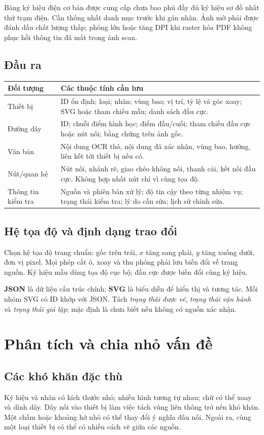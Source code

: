 \documentclass[11pt,a4paper]{article}
\begin{document}
Bảng ký hiệu điện cơ bản được cung cấp chưa bao phủ đầy đủ ký hiệu sơ đồ nhất thứ trạm điện. Cần thống nhất danh mục trước khi gán nhãn. Ảnh mờ phải được đánh dấu chất lượng thấp; phóng lớn hoặc tăng DPI khi raster hóa PDF không phục hồi thông tin đã mất trong ảnh scan.

\subsection{Đầu ra}
\begin{tabularx}{\linewidth}{@{}p{30mm}Y@{}}
\toprule
\textbf{Đối tượng} & \textbf{Các thuộc tính cần lưu}\\\midrule
Thiết bị & ID ổn định; loại; nhãn; vùng bao; vị trí, tỷ lệ và góc xoay; SVG hoặc tham chiếu mẫu; danh sách đầu cực.\\
Đường dây & ID; chuỗi điểm hình học; điểm đầu/cuối; tham chiếu đầu cực hoặc nút nối; bằng chứng trên ảnh gốc.\\
Văn bản & Nội dung OCR thô, nội dung đã xác nhận, vùng bao, hướng, liên kết tới thiết bị nếu có.\\
Nút/quan hệ & Nút nối, nhánh rẽ, giao chéo không nối, thanh cái, kết nối đầu cực. Không hợp nhất nút chỉ vì cùng tọa độ.\\
Thông tin kiểm tra & Nguồn và phiên bản xử lý; độ tin cậy theo từng nhiệm vụ; trạng thái kiểm tra; lý do cần sửa; lịch sử chỉnh sửa.\\\bottomrule
\end{tabularx}

\subsection{Hệ tọa độ và định dạng trao đổi}
Chọn hệ tọa độ trang chuẩn: gốc trên trái, $x$ tăng sang phải, $y$ tăng xuống dưới, đơn vị pixel. Mọi phép cắt ô, xoay và thu phóng phải lưu biến đổi về trang nguồn. Ký hiệu mẫu dùng tọa độ cục bộ; đầu cực được biến đổi cùng ký hiệu.

\textbf{JSON} là dữ liệu cấu trúc chính; \textbf{SVG} là biểu diễn để hiển thị và tương tác. Mỗi nhóm SVG có ID khớp với JSON. Tách \textit{trạng thái được vẽ}, \textit{trạng thái vận hành} và \textit{trạng thái giả lập}; mặc định là chưa biết nếu không có nguồn xác nhận.

\clearpage
\section{Phân tích và chia nhỏ vấn đề}
\subsection{Các khó khăn đặc thù}
Ký hiệu và nhãn có kích thước nhỏ; nhiều hình tương tự nhau; chữ có thể xoay và dính dây. Dây nối vào thiết bị làm việc tách vùng liên thông trở nên khó khăn. Một chấm hoặc khoảng hở nhỏ có thể thay đổi ý nghĩa đấu nối. Ngoài ra, cùng một loại thiết bị có thể có nhiều cách vẽ giữa các nguồn.
\end{document}

